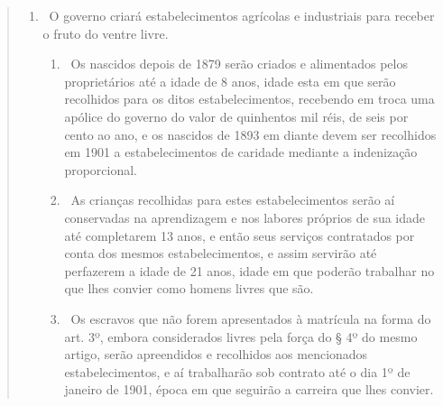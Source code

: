 {\begin{quote}
\begin{enumerate}[label=Art. \arabic*º]
\begin{enumerate}[label=§ \arabic*º]
\item\ Aberta a referida matrícula nos municípios, cada proprietário é
obrigado a exibir uma relação de seus escravos com as declarações do § 1º.

\item\ O escravo que não for dado a matrícula, por culpa ou malícia do
seu proprietário, \emph{ipso facto},\footnote{Necessariamente, pelo
  próprio fato.} será declarado livre.

\item\ O proprietário, no ato da entrega da relação dos seus escravos
para a matrícula, receberá em troca um conhecimento ou nota declarativa
do nome, idade, sexo, naturalidade, estado, cor, ofício, e sob que
título são possuídos. Este conhecimento será rubricado pelo agente e
escrivão da repartição municipal encarregada da matrícula e servirá de
título legal de propriedade dali em diante.
\end{enumerate}

\item\ O governo criará estabelecimentos agrícolas e industriais para
receber o fruto do ventre livre.

\begin{enumerate}[label=§ \arabic*º]
\item\ Os nascidos depois de 1879 serão criados e alimentados pelos
proprietários até a idade de 8 anos, idade esta em que serão recolhidos
para os ditos estabelecimentos, recebendo em troca uma apólice do
governo do valor de quinhentos mil réis, de seis por cento ao ano, e os
nascidos de 1893 em diante devem ser recolhidos em 1901 a
estabelecimentos de caridade mediante a indenização proporcional.

\item\ As crianças recolhidas para estes estabelecimentos serão aí
conservadas na aprendizagem e nos labores próprios de sua idade até
completarem 13 anos, e então seus serviços contratados por conta dos
mesmos estabelecimentos, e assim servirão até perfazerem a idade de 21
anos, idade em que poderão trabalhar no que lhes convier como homens
livres que são.

\item\ Os escravos que não forem apresentados à matrícula na forma do
art. 3º, embora considerados livres pela força do § 4º do mesmo artigo,
serão apreendidos e recolhidos aos mencionados estabelecimentos, e aí
trabalharão sob contrato até o dia 1º de janeiro de 1901, época em que
seguirão a carreira que lhes convier.
\end{enumerate}


\end{enumerate}
\end{quote}}
